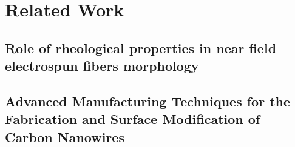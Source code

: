 
\chapter{Related Work} %

\label{Chapter:RelatedWork}



\section{Role of rheological properties in near field electrospun fibers morphology \cite{Flores2017}}


\section{Advanced Manufacturing Techniques for the Fabrication and Surface Modification of Carbon Nanowires \cite{Cardenas2017}}




